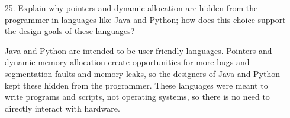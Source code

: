 \documentclass{article}
\begin{document}
\begin{itemize}
	\item[25.] Explain why pointers and dynamic allocation are hidden from the programmer in languages like Java and Python; how does this choice support the design goals of these languages?
		\begin{answer*}
			Java and Python are intended to be user friendly languages. Pointers and dynamic memory allocation create opportunities for more bugs and segmentation faults and memory leaks, so the designers of Java and Python kept these hidden from the programmer. These languages were meant to write programs and scripts, not operating systems, so there is no need to directly interact with hardware.
		\end{answer*}

\end{itemize}
\end{document}

